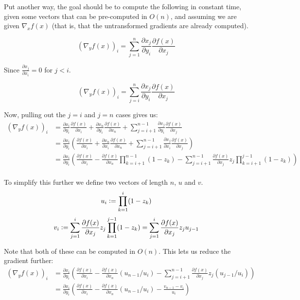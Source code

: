 \documentclass{article}
\newcommand{\defeq}{\vcentcolon=}
\begin{document}
Put another way, the goal should be to compute the following in constant time,
given some vectors that can be pre-computed in $O(n)$, and assuming we are given
$\nabla_x f(x)$ (that is, that the untransformed gradients are already
computed).

$$\left( \nabla_y f(x) \right)_i = \sum_{j=1}^{n} \frac{\partial x_j}{\partial
y_i} \frac{\partial f(x)}{\partial x_j}$$

Since $\frac{\partial x_j}{\partial x_i} = 0$ for $j < i$.

$$\left( \nabla_y f(x) \right)_i = \sum_{j=i}^{n} \frac{\partial x_j}{\partial
y_i} \frac{\partial f(x)}{\partial x_j}$$

Now, pulling out the $j=i$ and $j=n$ cases gives us:
\begin{align*}
\left( \nabla_y f(x) \right)_i &=
\frac{\partial x_i}{\partial y_i} \frac{\partial f(x)}{\partial x_i} +
\frac{\partial x_n}{\partial y_i} \frac{\partial f(x)}{\partial x_n} +
\sum_{j=i+1}^{n-1} \frac{\partial x_j}{\partial
y_i} \frac{\partial f(x)}{\partial x_j} \\
&=
\frac{\partial x_i}{\partial y_i} \left(
\frac{\partial f(x)}{\partial x_i} +
\frac{\partial x_n}{\partial x_i} \frac{\partial f(x)}{\partial x_n} +
\sum_{j=i+1}^{n-1} \frac{\partial x_j}{\partial
x_i} \frac{\partial f(x)}{\partial x_j} \right) \\
&=
\frac{\partial x_i}{\partial y_i} \left(
\frac{\partial f(x)}{\partial x_i} -
\frac{\partial f(x)}{\partial x_n} \prod_{k=i+1}^{n-1} (1 - z_k)
- \sum_{j=i+1}^{n-1} \frac{\partial f(x)}{\partial x_j}
z_j \prod_{k=i+1}^{j-1} (1 - z_k) \right) \\
\end{align*}

To simplify this further we define two vectors of length $n$, $u$ and $v$.
$$u_i \defeq \prod_{k=1}^{i} (1 - z_k)$$
$$v_i \defeq
\sum_{j=1}^{i} \frac{\partial f(x)}{\partial x_j} z_j \prod_{k=1}^{j-1} (1 - z_k)
= \sum_{j=1}^{i} \frac{\partial f(x)}{\partial x_j} z_j u_{j-1}
$$

Note that both of these can be computed in $O(n)$. This lets us reduce the
gradient further:
\begin{align*}
\left( \nabla_y f(x) \right)_i
&=
\frac{\partial x_i}{\partial y_i} \left(
\frac{\partial f(x)}{\partial x_i}
- \frac{\partial f(x)}{\partial x_n} (u_{n-1} / u_i)
- \sum_{j=i+1}^{n-1} \frac{\partial f(x)}{\partial x_j}
z_j (u_{j-1} / u_{i}) \right) \\
&=
\frac{\partial x_i}{\partial y_i} \left(
\frac{\partial f(x)}{\partial x_i}
- \frac{\partial f(x)}{\partial x_n} (u_{n-1} / u_i)
- \frac{v_{n-1} - v_i}{u_i} \right) \\
\end{align*}
\end{document}
